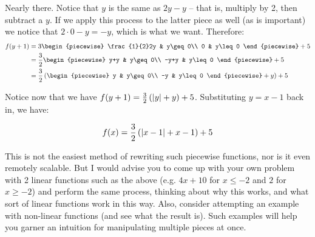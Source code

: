 \begin{example}[continued]
    Nearly there. Notice that $y$ is the same as $2y-y$ -- that is, multiply by 2, then subtract a $y$. If we apply this process to the latter piece as well (as is important) we notice that $2\cdot 0-y=-y$, which is what we want. Therefore:
    \begin{align*}
        f(y+1) &= 3\begin{piecewise}
            \frac{1}{2}2y & y\geq 0\\
            0 & y\leq 0
        \end{piecewise}+5\\
        &= \frac{3}{2}\begin{piecewise}
            y+y & y\geq 0\\
            -y+y & y\leq 0
        \end{piecewise}+5 \\
        &= \frac{3}{2}\left(\begin{piecewise}
            y & y\geq 0\\
            -y & y\leq 0
        \end{piecewise}+y\right)+5
    \end{align*}

    Notice now that we have $f(y+1)=\frac{3}{2}\left(\abs{y}+y\right)+5$. Substituting $y=x-1$ back in, we have:

    $$
        f(x)=\frac{3}{2}\left(\abs{x-1}+x-1\right)+5
    $$

    This is not the easiest method of rewriting such piecewise functions, nor is it even remotely scalable. But I would advise you to come up with your own problem with 2 linear functions such as the above (e.g. $4x+10$ for $x\leq -2$ and $2$ for $x\geq -2$) and perform the same process, thinking about why this works, and what sort of linear functions work in this way. Also, consider attempting an example with non-linear functions (and see what the result is). Such examples will help you garner an intuition for manipulating multiple pieces at once.
\end{example}



